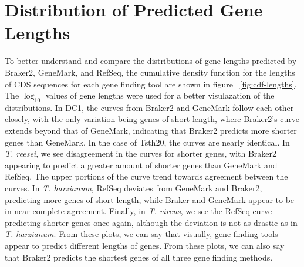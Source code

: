 \section{Distribution of Predicted Gene Lengths}

To better understand and compare the distributions of gene lengths
predicted by Braker2, GeneMark, and RefSeq, the cumulative density
function for the lengths of CDS sequences for each gene finding tool
are shown in figure ~\ref{fig:cdf-lengths}. The $\log_{10}$ values of
gene lengths were used for a better visulazation of the
distributions. In DC1, the curves from Braker2 and GeneMark follow
each other closely, with the only variation being genes of short
length, where Braker2's curve extends beyond that of GeneMark,
indicating that Braker2 predicts more shorter genes than GeneMark. In
the case of Tsth20, the curves are nearly identical. In
\textit{T. reesei}, we see disagreement in the curves for shorter
genes, with Braker2 appearing to predict a greater amount of shorter
genes than GeneMark and RefSeq. The upper portions of the curve trend
towards agreement between the curves. In \textit{T. harzianum}, RefSeq
deviates from GeneMark and Braker2, predicting more genes of short
length, while Braker and GeneMark appear to be in near-complete
agreement. Finally, in \textit{T. virens}, we see the RefSeq curve
predicting shorter genes once again, although the deviation is not as
drastic as in \textit{T. harzianum}. From these plots, we can say that
visually, gene finding tools appear to predict different lengths of
genes. From these plots, we can also say that Braker2 predicts the
shortest genes of all three gene finding methods.

